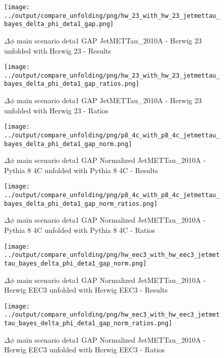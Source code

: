 \documentclass[11pt]{book}
\begin{document}
\begin{figure}[ht]
\centering
\texttt{[image: ../output/compare\_unfolding/png/hw\_23\_with\_hw\_23\_jetmettau\_bayes\_delta\_phi\_deta1\_gap.png]}
\caption{$\Delta\phi$ main scenario deta1 GAP JetMETTau\_2010A - Herwig 23 unfolded with Herwig 23 - Results}
\label{hw_23_hw_23_jetmettau_bayes_delta_phi_deta1_gap_a}
\end{figure}

\begin{figure}[ht]
\centering
\texttt{[image: ../output/compare\_unfolding/png/hw\_23\_with\_hw\_23\_jetmettau\_bayes\_delta\_phi\_deta1\_gap\_ratios.png]}
\caption{$\Delta\phi$ main scenario deta1 GAP JetMETTau\_2010A - Herwig 23 unfolded with Herwig 23 - Ratios}
\label{hw_23_hw_23_jetmettau_bayes_delta_phi_deta1_gap_b}
\end{figure}


\begin{figure}[ht]
\centering
\texttt{[image: ../output/compare\_unfolding/png/p8\_4c\_with\_p8\_4c\_jetmettau\_bayes\_delta\_phi\_deta1\_gap\_norm.png]}
\caption{$\Delta\phi$ main scenario deta1 GAP Normalized JetMETTau\_2010A - Pythia 8 4C unfolded with Pythia 8 4C - Results}
\label{p8_p8_jetmettau_bayes_delta_phi_deta1_gap_norm_a}
\end{figure}

\begin{figure}[ht]
\centering
\texttt{[image: ../output/compare\_unfolding/png/p8\_4c\_with\_p8\_4c\_jetmettau\_bayes\_delta\_phi\_deta1\_gap\_norm\_ratios.png]}
\caption{$\Delta\phi$ main scenario deta1 GAP Normalized JetMETTau\_2010A - Pythia 8 4C unfolded with Pythia 8 4C - Ratios}
\label{p8_p8_jetmettau_bayes_delta_phi_deta1_gap_norm_b}
\end{figure}

\begin{figure}[ht]
\centering
\texttt{[image: ../output/compare\_unfolding/png/hw\_eec3\_with\_hw\_eec3\_jetmettau\_bayes\_delta\_phi\_deta1\_gap\_norm.png]}
\caption{$\Delta\phi$ main scenario deta1 GAP Normalized JetMETTau\_2010A - Herwig EEC3 unfolded with Herwig EEC3 - Results}
\label{hw_eec3_hw_eec3_jetmettau_bayes_delta_phi_deta1_gap_norm_a}
\end{figure}

\begin{figure}[ht]
\centering
\texttt{[image: ../output/compare\_unfolding/png/hw\_eec3\_with\_hw\_eec3\_jetmettau\_bayes\_delta\_phi\_deta1\_gap\_norm\_ratios.png]}
\caption{$\Delta\phi$ main scenario deta1 GAP Normalized JetMETTau\_2010A - Herwig EEC3 unfolded with Herwig EEC3 - Ratios}
\label{hw_eec3_hw_eec3_jetmettau_bayes_delta_phi_deta1_gap_norm_b}
\end{figure}
\end{document}
